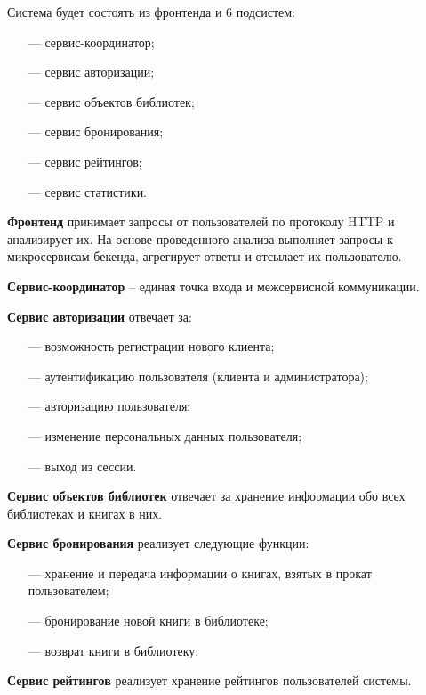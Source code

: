 \documentclass[a4paper, 12pt]{article}
\begin{document}
\begin{large}
Система будет состоять из фронтенда и 6 подсистем:
\begin{itemize}
	\item[---] сервис-координатор;
	\item[---] сервис авторизации;
	\item[---] сервис объектов библиотек;
	\item[---] сервис бронирования;
	\item[---] сервис рейтингов;
    \item[---] сервис статистики.
\end{itemize}
%
\textbf{Фронтенд} принимает запросы от пользователей по протоколу HTTP и анализирует их. На основе проведенного анализа выполняет запросы к микросервисам бекенда, агрегирует ответы и отсылает их пользователю. 

\textbf{Сервис-координатор} -- единая точка входа и межсервисной коммуникации. 

\textbf{Сервис авторизации} отвечает за:
\begin{itemize}
	\item[---] возможность регистрации нового клиента;
	
	\item[---] аутентификацию пользователя (клиента и администратора);
	
	\item[---] авторизацию пользователя;
	
	\item[---] изменение персональных данных пользователя;
	
	\item[---] выход из сессии.
\end{itemize}

\textbf{Сервис объектов библиотек} отвечает за хранение информации обо всех библиотеках и книгах в них. 

\textbf{Сервис бронирования} реализует следующие функции:
\begin{itemize}
	\item[---] хранение и передача информации о книгах, взятых в прокат пользователем;
	
	\item[---] бронирование новой книги в библиотеке;
	
	\item[---] возврат книги в библиотеку.
\end{itemize}

\textbf{Сервис рейтингов} реализует хранение рейтингов пользователей системы.


\end{large}
\end{document}
